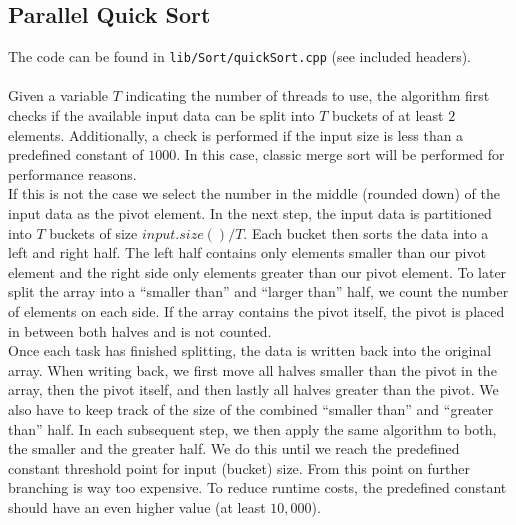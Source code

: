 \documentclass[twocolumn]{article}
\begin{document}
\subsection{Parallel Quick Sort}
The code can be found in \texttt{lib/Sort/quickSort.cpp} (see included headers).\\ 
\\
Given a variable $T$ indicating the number of threads to use, the algorithm first checks if the available input data can be split into $T$ buckets of at least $2$ elements. 
Additionally, a check is performed if the input size is less than a predefined constant of $1000$. 
In this case, classic merge sort will be performed for performance reasons.\\
If this is not the case we select the number in the middle (rounded down) of the input data as the pivot element. 
In the next step, the input data is partitioned into $T$ buckets of size $input.size()/T$. Each bucket then sorts the data into a left and right half. 
The left half contains only elements smaller than our pivot element and the right side only elements greater than our pivot element. 
To later split the array into a ``smaller than'' and ``larger than'' half, we count the number of elements on each side. 
If the array contains the pivot itself, the pivot is placed in between both halves and is not counted.\\
Once each task has finished splitting, the data is written back into the original array. 
When writing back, we first move all halves smaller than the pivot in the array, then the pivot itself, and then lastly all halves greater than the pivot. 
We also have to keep track of the size of the combined ``smaller than'' and ``greater than'' half. 
In each subsequent step, we then apply the same algorithm to both, the smaller and the greater half. 
We do this until we reach the predefined constant threshold point for input (bucket) size. 
From this point on further branching is way too expensive. 
To reduce runtime costs, the predefined constant should have an even higher value (at least $10,000$).
\end{document}
